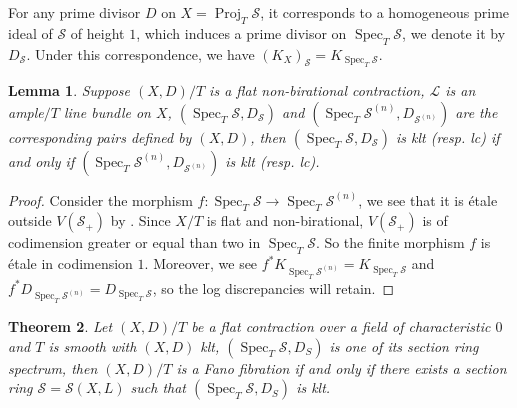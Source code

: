 \documentclass[letterpaper,reqno,12pt]{amsart}
\DeclareMathOperator{\Proj}{Proj}
\DeclareMathOperator{\Spec}{Spec}
\numberwithin{equation}{section}
\theoremstyle{plain}
\newtheorem{theorem}{Theorem}[section]
\newtheorem{lemma}[theorem]{Lemma}
\begin{document}
For any prime divisor $D$ on $X=\Proj_T \mathcal S$, it corresponds to a homogeneous prime ideal of $\mathcal S$ of height $1$, which induces a prime divisor on $\Spec_T \mathcal S$, we denote it by $D_\mathcal S$. Under this correspondence, we have $(K_{X})_\mathcal S=K_{\Spec_T\mathcal S}$. 
\begin{lemma}\label{kltcorresp}
    Suppose $(X,D)/T$ is a flat non-birational contraction, $\mathcal L$ is an ample$/T$ line bundle on $X$, $(\Spec_T\mathcal S,D_\mathcal S)$ and $(\Spec_T\mathcal S^{(n)},D_{\mathcal S^{(n)}})$ are the corresponding pairs defined by $(X,D)$, then $(\Spec_T\mathcal S,D_\mathcal S)$ is klt (resp. lc) if and only if $(\Spec_T\mathcal S^{(n)},D_{\mathcal S^{(n)}})$ is klt (resp. lc).
\end{lemma}
\begin{proof}
    Consider the morphism $f:\Spec_{T}\mathcal S\to \Spec_{T}\mathcal S^{(n)}$, we see that it is étale outside $V(\mathcal S_+)$ by . Since $X/T$ is flat and non-birational, $V(\mathcal S_+)$ is of codimension greater or equal than two in $\Spec_{T}\mathcal S$. So the finite morphism $f$ is étale in codimension $1$. Moreover, we see $f^*K_{\Spec_T\mathcal S^{(n)}}=K_{\Spec_T\mathcal S}$ and $f^*D_{\Spec_T\mathcal S^{(n)}}=D_{\Spec_T\mathcal S}$, so the log discrepancies will retain.
\end{proof}
\begin{theorem}\label{corresp}
    Let $(X,D)/T$ be a flat contraction over a field of characteristic $0$ and $T$ is smooth with $(X,D)$ klt, $(\Spec_T \mathcal S,D_S)$ is one of its section ring spectrum, then $(X,D)/T$ is a Fano fibration if and only if there exists a section ring $\mathcal S=\mathcal S(X,L)$ such that $(\Spec_T \mathcal S,D_S)$ is klt.
\end{theorem}
\end{document}
